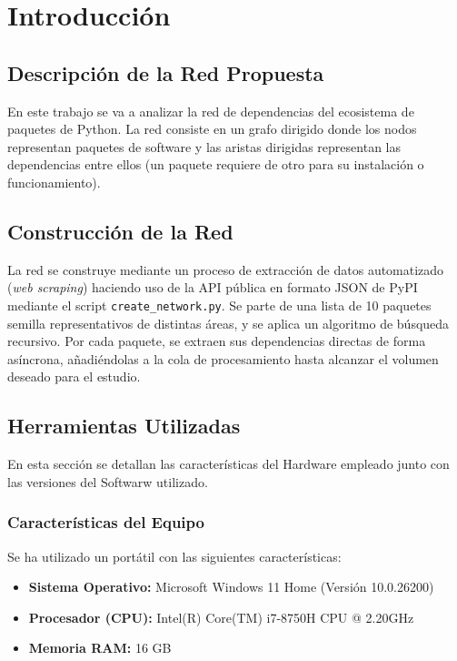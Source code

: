 \documentclass[12pt,a4paper]{report}
\begin{document}
	\chapter{Introducción}
	
	\section{Descripción de la Red Propuesta}
	En este trabajo se va a analizar la red de dependencias del ecosistema de paquetes de Python. La red consiste en un grafo dirigido donde los nodos representan paquetes de software y las aristas dirigidas representan las dependencias entre ellos (un paquete requiere de otro para su instalación o funcionamiento). 
	
	\section{Construcción de la Red}
	La red se construye mediante un proceso de extracción de datos automatizado (\textit{web scraping}) haciendo uso de la API pública en formato JSON de PyPI mediante el script \texttt{create\_network.py}. Se parte de una lista de 10 paquetes semilla representativos de distintas áreas, y se aplica un algoritmo de búsqueda recursivo. Por cada paquete, se extraen sus dependencias directas de forma asíncrona, añadiéndolas a la cola de procesamiento hasta alcanzar el volumen deseado para el estudio. 
	
	\section{Herramientas Utilizadas}
	En esta sección se detallan las características del Hardware empleado junto con las versiones del Softwarw utilizado.
	
	\subsection{Características del Equipo}
	Se ha utilizado un portátil con las siguientes características:
	\begin{itemize}
		\item \textbf{Sistema Operativo:} Microsoft Windows 11 Home (Versión 10.0.26200)
		\item \textbf{Procesador (CPU):} Intel(R) Core(TM) i7-8750H CPU @ 2.20GHz
		\item \textbf{Memoria RAM:} 16 GB
	\end{itemize}
	
\end{document}
